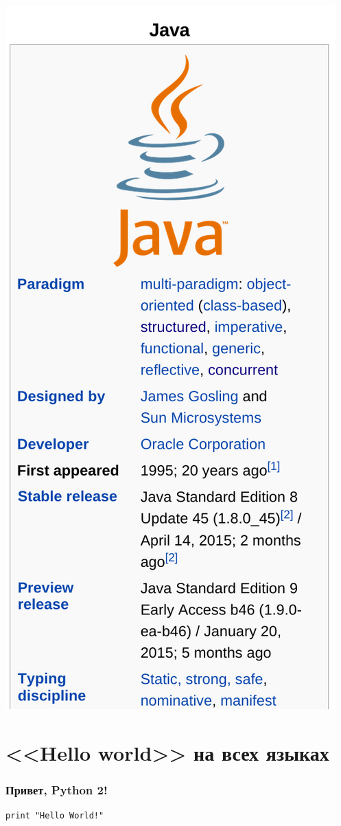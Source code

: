 {{\begin{center}
        \includegraphics[scale=0.12]{pictures/java.png}
      \end{center}
    }

  \section{<<Hello world>> на всех языках}
\begin{frame}[fragile]
  \frametitle{Привет, Python 2!}
  \begin{verbatim}
print "Hello World!"
  \end{verbatim}


\end{frame}}
